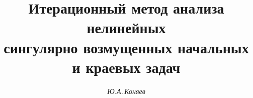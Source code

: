 

 




 


\newcommand{\diag}{\operatorname{diag}} 


\newcommand{\re}{\operatorname{Re}} 


\newcommand{\tts}[1]{} 


 




  


\setcounter{page}{38} 












 


\author{\it Ю.А.\,Коняев} 




\title{Итерационный метод анализа нелинейных\\ 


сингулярно возмущенных начальных\\ 


и краевых задач} 


 


\date{} 




\pagestyle{plain} %


 




